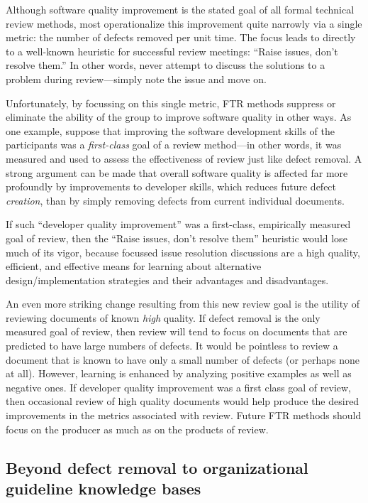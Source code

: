 Although software quality improvement is the stated goal of all formal
technical review methods, most operationalize this improvement quite
narrowly via a single metric: the number of defects removed per unit time.
The focus leads to directly to a well-known heuristic for successful review
meetings: ``Raise issues, don't resolve them.''  In other words, never
attempt to discuss the solutions to a problem during review---simply note
the issue and move on.

Unfortunately, by focussing on this single metric, FTR methods suppress or
eliminate the ability of the group to improve software quality in other
ways. As one example, suppose that improving the software development
skills of the participants was a {\em first-class} goal of a review
method---in other words, it was measured and used to assess the
effectiveness of review just like defect removal.  A strong argument can be
made that overall software quality is affected far more profoundly by
improvements to developer skills, which reduces future defect {\em creation}, than
by simply removing defects from current individual documents.

If such ``developer quality improvement'' was a first-class, empirically
measured goal of review, then the ``Raise issues, don't resolve them''
heuristic would lose much of its vigor, because focussed issue resolution
discussions are a high quality, efficient, and effective means for learning
about alternative design/implementation strategies and their advantages and
disadvantages.

An even more striking change resulting from this new review goal is the
utility of reviewing documents of known {\em high} quality.  If defect
removal is the only measured goal of review, then review will tend to focus
on documents that are predicted to have large numbers of defects. It would
be pointless to review a document that is known to have only a small number
of defects (or perhaps none at all).  However, learning is enhanced by
analyzing positive examples as well as negative ones. If developer quality
improvement was a first class goal of review, then occasional review of
high quality documents would help produce the desired improvements in the
metrics associated with review. Future FTR methods should focus on the
producer as much as on the products of review.


\subsection*{Beyond defect removal to organizational guideline knowledge bases}

